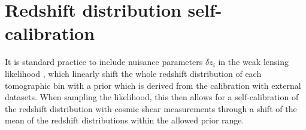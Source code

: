 \documentclass{aa}
\newcommand{\eq}[1]{\begin{equation}  #1 \end{equation}}
\begin{document}
%
%
\section{Redshift distribution self-calibration}
\label{sec:calibration}
It is standard practice to include nuisance parameters $\delta z_i$ in the weak lensing likelihood \citep{DES3, HSC2, asgari20}, which linearly shift the whole redshift distribution of each tomographic bin with a prior which is derived from the calibration with external datasets. When sampling the likelihood, this then allows for a self-calibration of the redshift distribution with cosmic shear measurements through a shift of the mean of the redshift distributions within the allowed prior range. 
\end{document}
